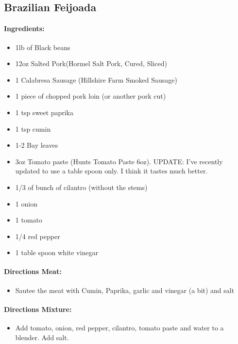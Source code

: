 \documentclass{article}
\begin{document}
\subsection{Brazilian Feijoada}

\paragraph{Ingredients:}

\begin{itemize}
	\item 1lb of Black beans 
	\item 12oz Salted Pork(Hormel Salt Pork, Cured, Sliced)
	\item 1 Calabresa Sausage (Hillshire Farm Smoked Sausage)
	\item 1 piece of chopped pork loin (or another pork cut)
	\item 1 tsp sweet paprika
	\item 1 tsp cumin
	\item 1-2 Bay leaves 
	\item 3oz Tomato paste (Hunts Tomato Paste 6oz). UPDATE: I've recently updated to use a table spoon only.  I think it tastes much better.
	\item 1/3 of bunch of cilantro (without the stems)
	\item 1 onion 
	\item 1 tomato 
	\item 1/4 red pepper 
	\item 1 table spoon white vinegar
\end{itemize}

\paragraph{Directions Meat:}
\begin{itemize}
	\item Sautee the meat with Cumin, Paprika, garlic and vinegar (a bit) and salt
\end{itemize}

\paragraph{Directions Mixture:}
\begin{itemize}
	\item Add tomato, onion, red pepper, cilantro, tomato paste and water to a blender. Add salt.
\end{itemize}
\end{document}
